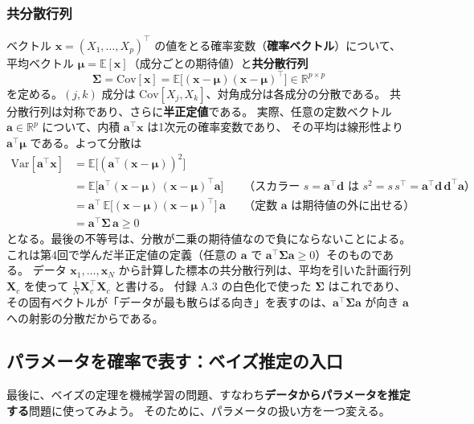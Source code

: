 \subsubsection{共分散行列}

ベクトル $\bm{x} = (X_1, \ldots, X_p)^\top$ の値をとる確率変数（\textbf{確率ベクトル}）について、
平均ベクトル $\bm{\mu} = \mathbb{E}[\bm{x}]$（成分ごとの期待値）と\textbf{共分散行列}
\begin{equation}
  \bm{\Sigma} = \mathrm{Cov}[\bm{x}] = \mathbb{E}\bigl[ (\bm{x} - \bm{\mu})(\bm{x} - \bm{\mu})^\top \bigr] \in \mathbb{R}^{p \times p}
  \label{eq:ch7-covmat}
\end{equation}
を定める。$(j, k)$ 成分は $\mathrm{Cov}[X_j, X_k]$、対角成分は各成分の分散である。
共分散行列は対称であり、さらに\textbf{半正定値}である。
実際、任意の定数ベクトル $\bm{a} \in \mathbb{R}^p$ について、内積 $\bm{a}^\top\bm{x}$ は1次元の確率変数であり、
その平均は線形性より $\bm{a}^\top\bm{\mu}$ である。よって分散は
\begin{align*}
  \mathrm{Var}[\bm{a}^\top\bm{x}]
  &= \mathbb{E}\bigl[ (\bm{a}^\top(\bm{x} - \bm{\mu}))^2 \bigr] \\
  &= \mathbb{E}\bigl[ \bm{a}^\top(\bm{x} - \bm{\mu})\,(\bm{x} - \bm{\mu})^\top\bm{a} \bigr]
   && \text{（スカラー $s = \bm{a}^\top\bm{d}$ は $s^2 = s\,s^\top = \bm{a}^\top\bm{d}\,\bm{d}^\top\bm{a}$）} \\
  &= \bm{a}^\top\,\mathbb{E}\bigl[ (\bm{x} - \bm{\mu})(\bm{x} - \bm{\mu})^\top \bigr]\,\bm{a}
   && \text{（定数 $\bm{a}$ は期待値の外に出せる）} \\
  &= \bm{a}^\top\bm{\Sigma}\,\bm{a} \geq 0
\end{align*}
となる。最後の不等号は、分散が二乗の期待値なので負にならないことによる。
これは第4回で学んだ半正定値の定義（任意の $\bm{a}$ で $\bm{a}^\top\bm{\Sigma}\bm{a} \geq 0$）そのものである。
データ $\bm{x}_1, \ldots, \bm{x}_N$ から計算した標本の共分散行列は、平均を引いた計画行列 $\bm{X}_c$ を使って $\frac{1}{N}\bm{X}_c^\top\bm{X}_c$ と書ける。
付録 A.3 の白色化で使った $\bm{\Sigma}$ はこれであり、
その固有ベクトルが「データが最も散らばる向き」を表すのは、$\bm{a}^\top\bm{\Sigma}\bm{a}$ が向き $\bm{a}$ への射影の分散だからである。


\subsection{パラメータを確率で表す：ベイズ推定の入口}

最後に、ベイズの定理を機械学習の問題、すなわち\textbf{データからパラメータを推定する}問題に使ってみよう。
そのために、パラメータの扱い方を一つ変える。

